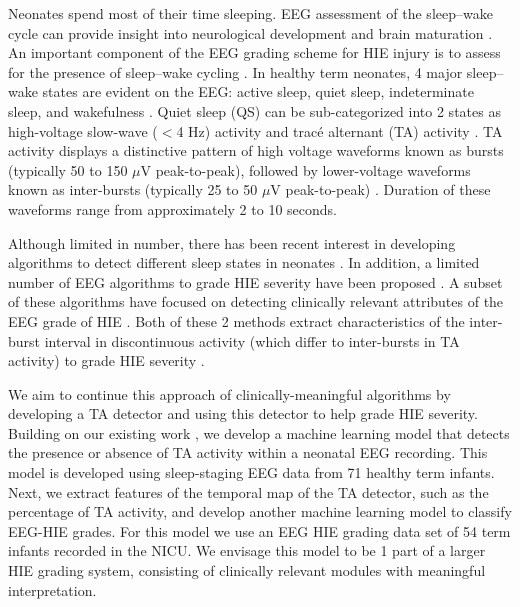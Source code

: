 \documentclass[conference]{IEEEtran}
\begin{document}
Neonates spend most of their time sleeping. EEG assessment of the sleep–wake cycle can provide insight into neurological development and brain maturation \cite{Scher2002, Abramsky2020}. An important component of the EEG grading scheme for HIE injury is to assess for the presence of sleep--wake cycling \cite{murray}. In healthy term neonates, 4 major sleep–wake states are evident on the EEG: active sleep, quiet sleep, indeterminate sleep, and wakefulness \cite{Dereymaeker1}. Quiet sleep (QS) can be sub-categorized into 2 states as high-voltage slow-wave ($<$4 Hz) activity and trac\'e alternant (TA) activity \cite{ACNS}. TA activity displays a distinctive pattern of high voltage waveforms known as bursts (typically 50 to 150 $\mu$V peak-to-peak), followed by lower-voltage waveforms known as inter-bursts (typically 25 to 50 $\mu$V peak-to-peak) \cite{ACNS}. Duration of these waveforms range from approximately 2 to 10 seconds.

Although limited in number, there has been recent interest in developing algorithms to detect different sleep states in neonates \cite{Pillay, Ansari, raurale2020ta}. In addition, a limited number of EEG algorithms to grade HIE severity have been proposed \cite{R11, R12, raurale2020cnn, R13, jne}. A subset of these algorithms have focused on detecting clinically relevant attributes of the EEG grade of HIE \cite{R13,matic2015}. Both of these 2 methods extract characteristics of the inter-burst interval in discontinuous activity (which differ to inter-bursts in TA activity) to grade HIE severity \cite{R13,matic2015}.

We aim to continue this approach of clinically-meaningful algorithms by developing a TA detector and using this detector to help grade HIE severity.
Building on our existing work \cite{raurale2020ta}, we develop a machine learning model that detects the presence or absence of TA activity within a neonatal EEG recording. This model is developed using sleep-staging EEG data from 71 healthy term infants.
Next, we extract features of the temporal map of the TA detector, such as the percentage of TA activity, and develop another machine learning model to classify EEG-HIE grades. For this model we use an EEG HIE grading data set of 54 term infants recorded in the NICU. We envisage this model to be 1 part of a larger HIE grading system, consisting of clinically relevant modules with meaningful interpretation.


\end{document}
